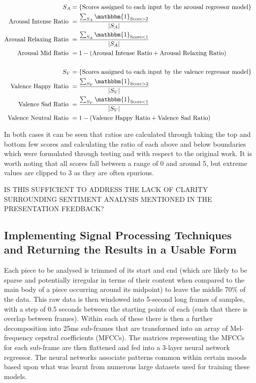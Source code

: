 \documentclass[12pt,]{article}
\begin{document}
\[\begin{aligned}
S_A &= \{\text{Scores assigned to each input by the arousal regressor model}\} \\
\text{Arousal Intense Ratio } &= \frac{\sum_{S_A} \mathbbm{1}_{\text{Score}> 2}}{|S_A|} \\
\text{Arousal Relaxing Ratio } &= \frac{\sum_{S_A} \mathbbm{1}_{\text{Score}< 1}}{|S_A|} \\
\text{Arousal Mid Ratio } &= 1 - (\text{Arousal Intense Ratio} + \text{Arousal Relaxing Ratio}) \\ \\
S_V &= \{\text{Scores assigned to each input by the valence regressor model}\} \\
\text{Valence Happy Ratio } &= \frac{\sum_{S_V} \mathbbm{1}_{\text{Score}> 2}}{|S_V|} \\
\text{Valence Sad Ratio } &= \frac{\sum_{S_V} \mathbbm{1}_{\text{Score}< 1}}{|S_V|} \\
\text{Valence Neutral Ratio } &= 1 - (\text{Valence Happy Ratio} + \text{Valence Sad Ratio}) \\
\end{aligned}\]

In both cases it can be seen that ratios are calculated through taking
the top and bottom few scores and calculating the ratio of each above
and below boundaries which were formulated through testing and with
respect to the original work. It is worth noting that all scores fall
between a range of 0 and around 5, but extreme values are clipped to 3
as they are often spurious.

IS THIS SUFFICIENT TO ADDRESS THE LACK OF CLARITY SURROUNDING SENTIMENT
ANALYSIS MENTIONED IN THE PRESENTATION FEEDBACK?

\hypertarget{implementing-signal-processing-techniques-and-returning-the-results-in-a-usable-form}{%
\subsection{Implementing Signal Processing Techniques and Returning the
Results in a Usable
Form}\label{implementing-signal-processing-techniques-and-returning-the-results-in-a-usable-form}}

Each piece to be analysed is trimmed of its start and end (which are
likely to be sparse and potentially irregular in terms of their content
when compared to the main body of a piece occurring around its midpoint)
to leave the middle 70\% of the data. This raw data is then windowed
into 5-second long frames of samples, with a step of 0.5 seconds between
the starting points of each (such that there is overlap between frames).
Within each of these there is then a further decomposition into 25ms
sub-frames that are transformed into an array of Mel-frequency cepstral
coefficients (MFCCs). The matrices representing the MFCCs for each
sub-frame are then flattened and fed into a 3-layer neural network
regressor. The neural networks associate patterns common within certain
moods based upon what was learnt from numerous large datasets used for
training these models.
\end{document}
